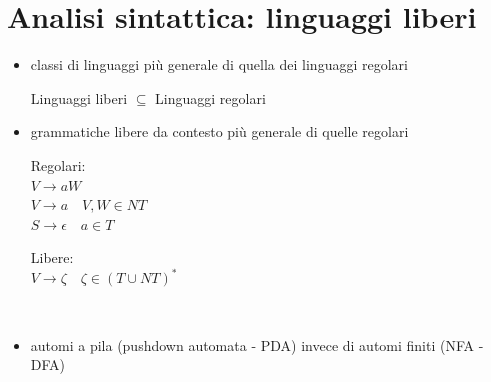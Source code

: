 \documentclass[a4paper,12pt]{article}
\begin{document}
{\section{Analisi sintattica: linguaggi liberi}
\begin{itemize}
  \item classi di linguaggi più generale di quella dei linguaggi regolari 
  \begin{center}
    Linguaggi liberi $\subseteq$ Linguaggi regolari
  \end{center} 
  \item grammatiche libere da contesto più generale di quelle regolari \\
  \begin{minipage}{0.45\textwidth}
   Regolari: \\
   $V \to aW$ \\
   $V \to a \quad V, W \in NT$ \\
   $S \to \epsilon \quad a \in T$
  \end{minipage}
  \begin{minipage}{0.45\textwidth}
  Libere: \\
  $V \to \zeta \quad \zeta \in (T \cup NT)^*$
  \end{minipage} \\
  \item automi a pila (pushdown automata - PDA) invece di automi finiti (NFA - DFA) \\
\end{itemize}  
}
\end{document}
